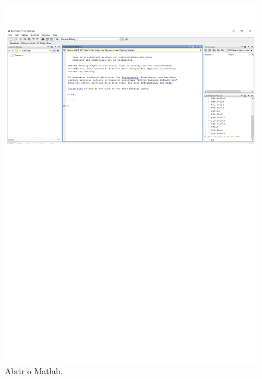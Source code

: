 \documentclass[10pt]{article}
\begin{document}
\begin{figure}[H]
    \centering
    \includegraphics[scale=0.7]{fig1teste.pdf}
    \caption{Abrir o Matlab.}
\end{figure}
\end{document}
